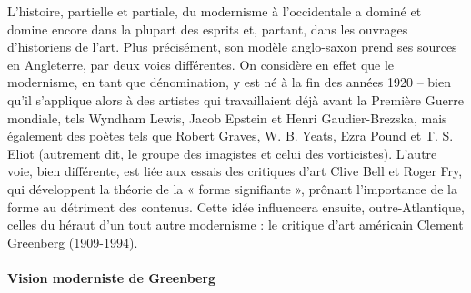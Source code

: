 L'histoire, partielle et partiale, du modernisme à l'occidentale a dominé et domine encore dans la plupart des esprits et, partant, dans les ouvrages d'historiens de l'art. Plus précisément, son modèle anglo-saxon prend ses sources en Angleterre, par deux voies différentes. On considère en effet que le modernisme, en tant que dénomination, y est né à la fin des années 1920 – bien qu'il s'applique alors à des artistes qui travaillaient déjà avant la Première Guerre mondiale, tels Wyndham Lewis, Jacob Epstein et Henri Gaudier-Brezska, mais également des poètes tels que Robert Graves, W. B. Yeats, Ezra Pound et T. S. Eliot (autrement dit, le groupe des imagistes et celui des vorticistes). L'autre voie, bien différente, est liée aux essais des critiques d'art Clive Bell et Roger Fry, qui développent la théorie de la
« forme signifiante », prônant l'importance de la forme au détriment des contenus. Cette idée influencera ensuite, outre-Atlantique, celles du héraut d'un tout autre modernisme : le critique d'art américain Clement Greenberg (1909-1994).

\paragraph{Vision moderniste de Greenberg}


